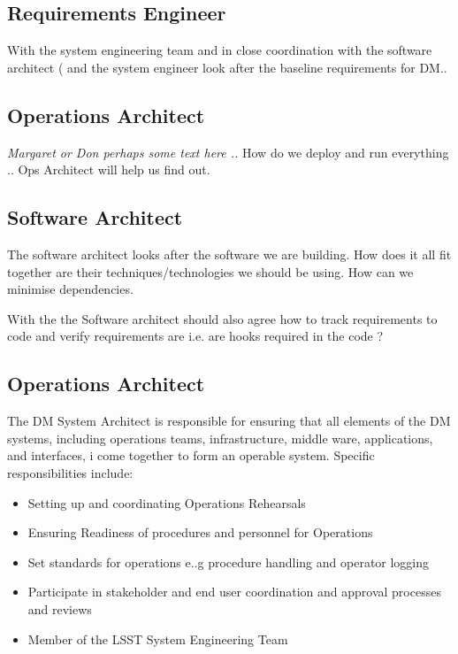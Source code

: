 \subsection{Requirements Engineer \label{role:reqeng}}
With the system engineering team  and in close coordination with the software architect ( and the system engineer  look after the baseline requirements for DM.. 


\subsection{Operations Architect \label{role:opsarc}}
{\em Margaret  or Don perhaps some text here .. }
How do we deploy and run everything .. Ops Architect will help us find out. 


\subsection{Software Architect \label{role:softarc}}
The software architect looks after the software we are building. How does it all fit together are their techniques/technologies we should be using. How can we minimise dependencies. 

With the  the Software architect should also agree how to track requirements to code and verify requirements are i.e. are hooks required in the code ?
\subsection{Operations Architect \label{role:sysarc}}
The DM System Architect is responsible for ensuring that all elements of the DM systems, including operations teams, infrastructure, middle ware, applications, and interfaces, i
come together to form an operable system. 
Specific responsibilities include:
\begin{itemize}
\item Setting up and coordinating  Operations Rehearsals
\item Ensuring Readiness of procedures and personnel for Operations
\item Set standards for operations e..g procedure handling and operator logging
\item Participate in stakeholder and end user coordination and approval processes and reviews
\item Member of the LSST System Engineering Team
\end{itemize}


